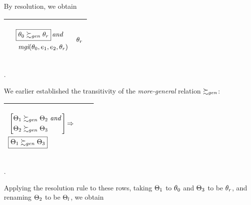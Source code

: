 \documentclass[runningheads]{llncs}
\DeclareMathOperator{\uand}{\emph{and}\,}
\DeclareMathOperator{\uimplies}{\Rightarrow}
\DeclareMathOperator{\mgi}{\emph{mgi}}
\begin{document}
By resolution, we obtain
\begin{center}
\begin{tabular}{|m{}|m{}||m{}|}
 \hline 
  & 
   \begin{center}
{$\begin{aligned}
&  \boxed{\thet{0} \moregen \thet{r}} \uand   \\
  &\,\,{\mgi}(\thet{0}, \e{1}, \e{2}, \thet{r})
\end{aligned}$}
\end{center}
& 
\begin{center}

$ \begin{aligned}
   \theta_{r}
 \end{aligned}    
$
\end{center}
\\
\hline
\end{tabular}.
\end{center}



We earlier established the transitivity of the \emph{more-general} relation $\succsim_{gen}$:
\begin{center}
  \begin{tabular}{|m{}|m{}||m{}|}
\hline
\begin{center}
$\begin{aligned}
&\left[\begin{aligned}
    &\Thet{1} \moregen \Thet{2} \, \uand \\
    &\Thet{2} \moregen \Thet{3}
    \end{aligned}\right]
    \uimplies \\
&\boxed{\Thet{1} \moregen \Thet{3}}
   \end{aligned}$  
\end{center}& &  \\  \hline
\end{tabular}.
\end{center}
Applying the resolution rule to these rows, taking $\Theta_{1}$ to $\theta_{0}$ and $\Theta_{3}$ to be $\theta_{r}$, and renaming $\Theta_{2}$ to be $\Theta_{l}$, we obtain
\end{document}
